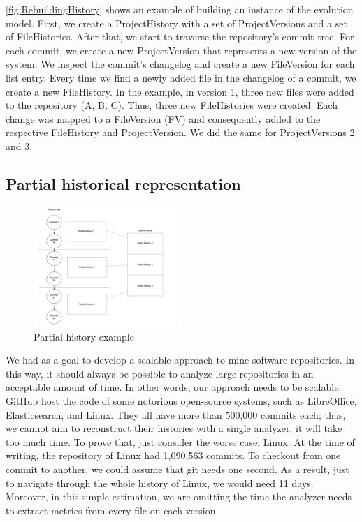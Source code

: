 \autoref{fig:RebuildingHistory} shows an example of building an instance of the evolution model.
First, we create a ProjectHistory with a set of ProjectVersions and a set of FileHistories.
After that, we start to traverse the repository's commit tree.
For each commit, we create a new ProjectVersion that represents a new version of the system. 
We inspect the commit's changelog and create a new FileVersion for each list entry.
Every time we find a newly added file in the changelog of a commit, we create a new FileHistory. 
In the example, in version 1, three new files were added to the repository (A, B, C). Thus, three new FileHistories were created.
Each change was mapped to a FileVersion (FV) and consequently added to the respective FileHistory and ProjectVersion. 
We did the same for ProjectVersions 2 and 3. 

\label{sec:partialHistoricalRepr}
\subsection{Partial historical representation}
\begin{figure}[ht]
    \begin{center}
        \includegraphics[width=0.5\textwidth]{PartialHistory.png}
    \end{center}
    \caption{Partial history example}
    \label{fig:PartialHistory}
\end{figure}
We had as a goal to develop a scalable approach to mine software repositories. In this way, it should always be possible to analyze large repositories in an acceptable amount of time. 
In other words, our approach needs to be scalable.
GitHub host the code of some notorious open-source systems, such as LibreOffice, Elasticsearch, and Linux.
They all have more than 500,000 commits each; thus, we cannot aim to reconstruct their histories with a single analyzer; it will take too much time.  
To prove that, just consider the worse case: Linux. 
At the time of writing, the repository of Linux had 1,090,563 commits. 
To checkout from one commit to another, we could assume that git needs one second. 
As a result, just to navigate through the whole history of Linux, we would need 11 days.
Moreover, in this simple estimation, we are omitting the time the analyzer needs to extract metrics from every file on each version. 

